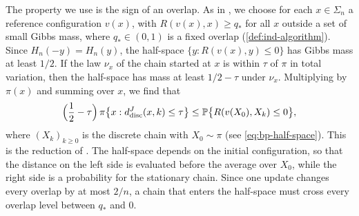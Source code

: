 The property we use is the sign of an overlap. As in
\cite[Section~8]{oai-barriers}, we choose for each $x\in\Sigma_n$ a reference
configuration $v(x)$, with $R(v(x),x)\ge q_*$ for all $x$ outside a set of small
Gibbs mass, where $q_*\in(0,1)$ is a fixed overlap (\cref{def:ind-algorithm}). Since $H_n(-y)=H_n(y)$, the half-space
$\{y:R(v(x),y)\le0\}$ has Gibbs mass at least $1/2$. If the law $\nu_x$ of the
chain started at $x$ is within $\tau$ of $\pi$ in total variation, then the
half-space has mass at least $1/2-\tau$ under $\nu_x$. Multiplying by
$\pi(x)$ and summing over $x$, we find that
\begin{equation}\label{eq:ov-half-space}
 \Bigl(\frac12-\tau\Bigr)\,\pi\bigl\{x:d^J_{\rm disc}(x,k)\le\tau\bigr\}
 \le\mathbb P\bigl\{R(v(X_0),X_k)\le0\bigr\},
\end{equation}
where $(X_k)_{k\ge0}$ is the discrete chain with $X_0\sim\pi$
(see \eqref{eq:bp-half-space}). This is the reduction of
\cite[(8.1)--(8.3)]{oai-barriers}. The half-space depends on the
initial configuration, so that the distance on the left side is evaluated
before the average over $X_0$, while the right side is a probability for the
stationary chain. Since one update changes every overlap by at most $2/n$, a
chain that enters the half-space must cross every overlap level between $q_*$
and $0$.

